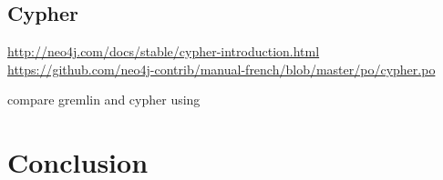   \subsection{Cypher}

  {\color{red}
    \url{http://neo4j.com/docs/stable/cypher-introduction.html}\\
    \url{https://github.com/neo4j-contrib/manual-french/blob/master/po/cypher.po}
  }



  {\color{red}
    compare gremlin and cypher using\cite{holzschuher2013performance}
  }

\section{Conclusion}

